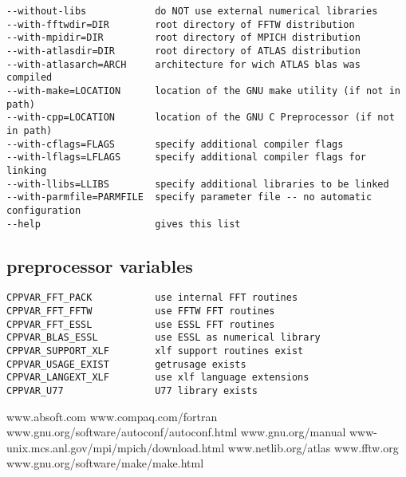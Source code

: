 \documentclass[a4paper,10pt]{article}
\begin{document}
\begin{verbatim}
--without-libs            do NOT use external numerical libraries
--with-fftwdir=DIR        root directory of FFTW distribution
--with-mpidir=DIR         root directory of MPICH distribution
--with-atlasdir=DIR       root directory of ATLAS distribution
--with-atlasarch=ARCH     architecture for wich ATLAS blas was compiled 
--with-make=LOCATION      location of the GNU make utility (if not in path)
--with-cpp=LOCATION       location of the GNU C Preprocessor (if not in path)
--with-cflags=FLAGS       specify additional compiler flags
--with-lflags=LFLAGS      specify additional compiler flags for linking
--with-llibs=LLIBS        specify additional libraries to be linked
--with-parmfile=PARMFILE  specify parameter file -- no automatic configuration
--help                    gives this list
\end{verbatim}

\subsection*{preprocessor variables}

\begin{verbatim}
CPPVAR_FFT_PACK           use internal FFT routines
CPPVAR_FFT_FFTW           use FFTW FFT routines
CPPVAR_FFT_ESSL           use ESSL FFT routines
CPPVAR_BLAS_ESSL          use ESSL as numerical library
CPPVAR_SUPPORT_XLF        xlf support routines exist
CPPVAR_USAGE_EXIST        getrusage exists
CPPVAR_LANGEXT_XLF        use xlf language extensions
CPPVAR_U77                U77 library exists
\end{verbatim}


\begin{thebibliography}{99}
 www.absoft.com
 www.compaq.com/fortran
 www.gnu.org/software/autoconf/autoconf.html
 www.gnu.org/manual
 www-unix.mcs.anl.gov/mpi/mpich/download.html
 www.netlib.org/atlas
 www.fftw.org
 www.gnu.org/software/make/make.html
\end{thebibliography}
\end{document}
